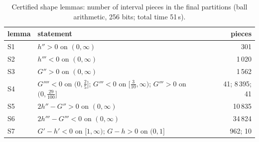 \documentclass[11pt,a4paper]{article}
\theoremstyle{definition}
\theoremstyle{remark}
\begin{document}
\begin{table}[ht]
\centering
\begin{tabular}{llr}
\toprule
lemma & statement & pieces\\
\midrule
S1 & $h''>0$ on $(0,\infty)$ & 301\\
S2 & $h'''<0$ on $(0,\infty)$ & 1\,020\\
S3 & $G''>0$ on $(0,\infty)$ & 1\,562\\
S4 & $G''''<0$ on $(0,\frac25]$; $G'''<0$ on $[\frac3{10},\infty)$; $G'''>0$ on $(0,\frac{29}{100}]$ & 41; 8\,395; 41\\
S5 & $2h''-G''>0$ on $(0,\infty)$ & 10\,835\\
S6 & $2h'''-G'''<0$ on $(0,\infty)$ & 34\,824\\
S7 & $G'-h'<0$ on $[1,\infty)$; $G-h>0$ on $(0,1]$ & 962; 10\\
\bottomrule
\end{tabular}
\caption{Certified shape lemmas: number of interval pieces in the final partitions (ball arithmetic, 256 bits; total time 51\,s).}\label{tab:shape}
\end{table}
\end{document}
